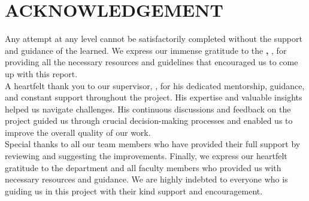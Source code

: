 \chapter*{ACKNOWLEDGEMENT}

Any attempt at any level cannot be satisfactorily completed without the support and guidance of the learned. We express our immense gratitude to the \textbf{\cDept, \cCampus}, for providing all the necessary resources and guidelines that encouraged us to come up with this report.\\[10pt]
A heartfelt thank you to our supervisor, \textbf{\cSupervisor}, for his dedicated mentorship, guidance, and constant support throughout the project. His expertise and valuable insights helped us navigate challenges. His continuous discussions and feedback on the project guided us through crucial decision-making processes and enabled us to improve the overall quality of our work.\\[10pt]
Special thanks to all our team members who have provided their full support by reviewing and suggesting the improvements. Finally, we express our heartfelt gratitude to the department and all faculty members who provided us with necessary resources and guidance. We are highly indebted to everyone who is guiding us in this project with their kind support and encouragement.\\[15pt]
\authorTable

